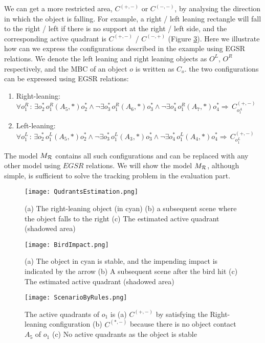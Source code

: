 \documentclass[letterpaper]{article}
\begin{document}
We can get a more restricted area, $C^{(+,-)}$ or $C^{(-,-)}$, by analysing the direction in which the object is falling. For example, a right / left leaning rectangle will fall to the right / left if there is no support at the right / left side, and the corresponding active quadrant is $C^{(+,-)}$ / $C^{(-, +)}$ (Figure \ref{QudrantsEstimation}). Here we illustrate how can we express the configurations described in the example using EGSR relations. We denote the left leaning and right leaning objects as $O^L$, $O^R$ respectively, and the MBC of an object $o$ is written as $C_{o}$. the two configurations can be expressed using EGSR relations:
\begin{enumerate}
\item Right-leaning: $\forall o^R_1\,:\, \exists o^*_2\,o^R_1 (A_5, *) o^*_2 \wedge\neg\exists o^*_3\,o^R_1 (A_6, *) o^*_3 \wedge\neg\exists o^*_4\,o^R_1 (A_7, *) o^*_4 \Rightarrow \, C_{o^A_1}^{(+,-)}$

\item Left-leaning: $\forall o^L_1\,:\, \exists o^*_2\,o^L_1 (A_5, *) o^*_2 \wedge\neg\exists o^*_3\,o^L_1 (A_3, *) o^*_3 \wedge\neg\exists o^*_4\,o^L_1 (A_4, *) o^*_4 \Rightarrow \, C_{o^L_1}^{(+,-)}$
\end{enumerate}
The model $M_{\cal{R}}$ contains all such configurations and can be replaced with any other model using $EGSR$ relations. We will show the model $M_{\cal{R}}$, although simple, is sufficient to solve the tracking problem in the evaluation part.  


\begin{figure}[h!]
\centering\texttt{[image: QudrantsEstimation.png]}\caption{(a) The right-leaning object (in cyan)  (b) a subsequent scene where the object falls to the right (c) The estimated active quadrant (shadowed area)}
\label{QudrantsEstimation}
\end{figure}


\begin{figure}[h!]
\centering\texttt{[image: BirdImpact.png]}\caption{(a) The object in cyan is stable, and the impending impact is indicated by the arrow (b) A subsequent scene after the bird hit (c) The estimated active quadrant (shadowed area)}
\label{BirdImpact}
\end{figure}

\begin{figure}[h!]
\centering\texttt{[image: ScenarioByRules.png]}\caption{ The active quadrants of $o_1$ is (a) $C^{(+,-)}$ by satisfying the Right-leaning configuration (b) $C^{(*,-)}$ because there is no object contact $A_5$ of $o_1$ (c) No active quadrants as the object is stable}
\label{QudrantsEstimation}
\end{figure}



 
\end{document}
